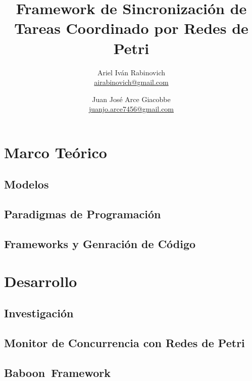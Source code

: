 \documentclass{report}
\date{}
\begin{document}
    \newcommand{\nombreTesis}{Framework de Sincronización de Tareas Coordinado
    por Redes de Petri}
    \newcommand{\nombreFramework}{Baboon}
    \title{\nombreTesis}
    \author{Ariel Iván Rabinovich \\ \href{mailto:airabinovich@gmail.com}{airabinovich@gmail.com}
        \and Juan José Arce Giacobbe \\ \href{mailto:juanjo.arce7546@gmail.com}{juanjo.arce7456@gmail.com}}
    \graphicspath{ {resources/images/} }
    
    \maketitle
    
    \tableofcontents
    
    \listoffigures
    \listoftables
    
    \part{Marco Teórico}
        \chapter{Modelos}
            
        \chapter{Paradigmas de Programación}
            
            
        \chapter{Frameworks y Genración de Código}
            
            

    \part{Desarrollo}
        \chapter{Investigación}
            
        \chapter{Monitor de Concurrencia con Redes de Petri}
            
        \chapter{\nombreFramework \  Framework}
            

    
	
\end{document}
